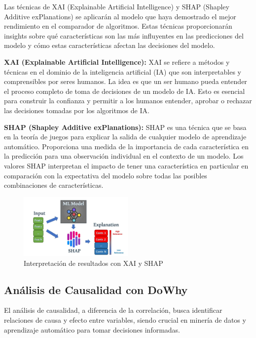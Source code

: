 Las técnicas de XAI (Explainable Artificial Intelligence) y SHAP (Shapley Additive exPlanations) se aplicarán al modelo que haya demostrado el mejor rendimiento en el comparador de algoritmos. Estas técnicas proporcionarán insights sobre qué características son las más influyentes en las predicciones del modelo y cómo estas características afectan las decisiones del modelo.

\textbf{XAI (Explainable Artificial Intelligence):} XAI se refiere a métodos y técnicas en el dominio de la inteligencia artificial (IA) que son interpretables y comprensibles por seres humanos. La idea es que un ser humano pueda entender el proceso completo de toma de decisiones de un modelo de IA. Esto es esencial para construir la confianza y permitir a los humanos entender, aprobar o rechazar las decisiones tomadas por los algoritmos de IA.

\textbf{SHAP (Shapley Additive exPlanations):} SHAP es una técnica que se basa en la teoría de juegos para explicar la salida de cualquier modelo de aprendizaje automático. Proporciona una medida de la importancia de cada característica en la predicción para una observación individual en el contexto de un modelo. Los valores SHAP interpretan el impacto de tener una característica en particular en comparación con la expectativa del modelo sobre todas las posibles combinaciones de características.

\begin{figure}[H]
  \centering
  \includegraphics[width=0.5\textwidth]{img/xai_shap.jpg}
  \caption{Interpretación de resultados con XAI y SHAP}
  \label{fig:xai_shap}
\end{figure}

\subsection{Análisis de Causalidad con DoWhy}
\label{subsec:analisisCausalDowhy}

El análisis de causalidad, a diferencia de la correlación, busca identificar relaciones de causa y efecto entre variables, siendo crucial en minería de datos y aprendizaje automático para tomar decisiones informadas.

